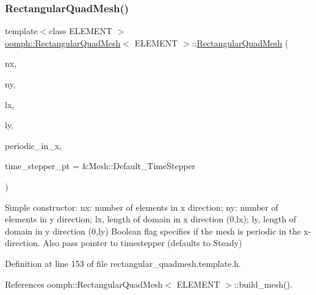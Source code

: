 \subsubsection{\texorpdfstring{Rectangular\+Quad\+Mesh()}{RectangularQuadMesh()}\hspace{0.1cm}{\footnotesize\ttfamily [4/5]}}
{\footnotesize\ttfamily template$<$class E\+L\+E\+M\+E\+NT $>$ \\
\hyperlink{classoomph_1_1RectangularQuadMesh}{oomph\+::\+Rectangular\+Quad\+Mesh}$<$ E\+L\+E\+M\+E\+NT $>$\+::\hyperlink{classoomph_1_1RectangularQuadMesh}{Rectangular\+Quad\+Mesh} (\begin{DoxyParamCaption}\item[{const unsigned \&}]{nx,  }\item[{const unsigned \&}]{ny,  }\item[{const double \&}]{lx,  }\item[{const double \&}]{ly,  }\item[{const bool \&}]{periodic\+\_\+in\+\_\+x,  }\item[{Time\+Stepper $\ast$}]{time\+\_\+stepper\+\_\+pt = {\ttfamily \&Mesh\+:\+:Default\+\_\+TimeStepper} }\end{DoxyParamCaption})\hspace{0.3cm}{\ttfamily [inline]}}



Simple constructor\+: nx\+: number of elements in x direction; ny\+: number of elements in y direction; lx, length of domain in x direction (0,lx); ly, length of domain in y direction (0,ly) Boolean flag specifies if the mesh is periodic in the x-\/direction. Also pass pointer to timestepper (defaults to Steady) 



Definition at line 153 of file rectangular\+\_\+quadmesh.\+template.\+h.



References oomph\+::\+Rectangular\+Quad\+Mesh$<$ E\+L\+E\+M\+E\+N\+T $>$\+::build\+\_\+mesh().

\mbox{\label{classoomph_1_1RectangularQuadMesh_ac36869a7d72ec7524b18272657cb6167}} 
